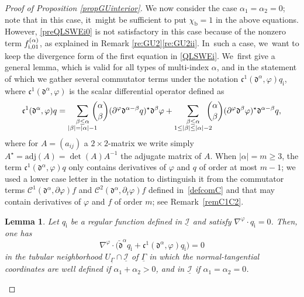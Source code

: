 \documentclass[10pt]{amsart}
\newcommand{\cI}{{\mathcal I}}
\newcommand{\ul}[1]{\underline{#1}}
\newcommand{\itGamma}{\mathit{\Gamma}}
\newcommand{\cmfalpha}{\check{\mathfrak{d}}^{\alpha}}
\newtheorem{lemma}[theorem]{Lemma}
\theoremstyle{definition}
\begin{document}
\begin{proof}[Proof of Proposition \ref{propGUinterior}]
We now consider the case $\alpha_1=\alpha_2=0$; note that in this case, it~might be sufficient to put $\chi_\mathrm{b}=1$ in the above equations.
However, \eqref{preQLSWEi0} is not satisfactory in this case because of the nonzero term $f_{{\rm i},01}^{(\alpha)}$, as explained in Remark \ref{re:GU2}\eqref{re:GU2ii}. In~such a case, we~want to keep the divergence form of the first equation in \eqref{QLSWEi}. We~first give a general lemma, which is valid for all types of multi-index $\alpha$,
and in the statement of which we gather several commutator terms under the notation ${\mathfrak c}^1({\mathfrak d}^\alpha,\varphi)q_\mathrm{i}$,
where ${\mathfrak c}^1({\mathfrak d}^\alpha,\varphi)$ is the scalar differential operator defined as
\begin{equation}
\mathfrak{c}^1({\mathfrak d}^\alpha,\varphi) q
= \sum_{\substack{\beta\leq\alpha\\ |\beta|=|\alpha|-1}}\hspace*{-3mm}\binom{\alpha}{\beta} (\partial^\varphi\mathfrak{d}^{\alpha-\beta} q)^\star \mathfrak{d}^{\beta}\varphi
+ \sum_{\substack{\beta\leq\alpha\\ 1 \leq |\beta| \leq |\alpha|-2}} \hspace*{-3mm}\binom{\alpha}{\beta}
(\partial^\varphi\mathfrak{d}^{\beta}\varphi)^\star \mathfrak{d}^{\alpha-\beta} q,
\end{equation}
where for $A=(a_{ij})$ a $2\times2$-matrix we write simply $A^\star=\mbox{adj}(A)=\det(A)A^{-1}$ the adjugate matrix of $A$.
When $\vert \alpha\vert=m\geq 3$,
the term $\mathfrak{c}^1({\mathfrak d}^\alpha,\varphi) q$ only contains derivatives of $\varphi$ and $q$ of order at most $m-1$;
we used a lower case letter in the notation to distinguish it from the commutator terms ${\mathcal C}^1(\mathfrak{d}^\alpha,\partial \varphi)f$ and
${\mathcal C}^2(\mathfrak{d}^\alpha,\partial_t \varphi)f$ defined in~\eqref{defcomC} and that may contain derivatives of $\varphi$ and $f$ of order $m$;
see Remark~\ref{remC1C2}.

\begin{lemma}
Let $q_\mathrm{i}$ be a regular function defined in $\ul{\cI}$ and satisfy $\nabla^\varphi\cdot q_\mathrm{i}=0$.
Then, one has
\[
\nabla^\varphi\cdot\big(\cmfalpha q_\mathrm{i} + \mathfrak{c}^1({\mathfrak d}^\alpha,\varphi) q_\mathrm{i} \big) = 0
\]
in the tubular neighborhood $U_{\ul{\itGamma}}\cap \ul{\cI}$ of $\underline{\itGamma}$
in which the normal-tangential coordinates are well defined if $\alpha_1+\alpha_2>0$, and in $\ul{\cI}$ if $\alpha_1=\alpha_2=0$.
\end{lemma}


\end{proof}
\end{document}

